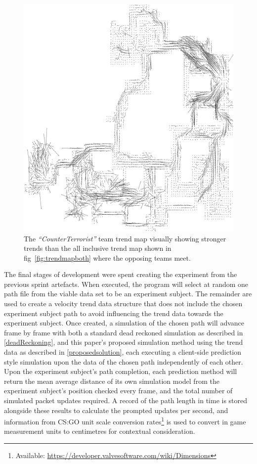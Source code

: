 \documentclass[journal]{IEEEtran}
\begin{document}
\begin{figure}[h]
    \centering
    \includegraphics[width=\linewidth]{TrendMapCT.png}
    \caption{The \textit{``CounterTerrorist''} team trend map visually showing stronger trends than the all inclusive trend map shown in fig~\ref{fig:trendmapboth} where the opposing teams meet.}
    \label{fig:trendmap_ct}
\end{figure}

The final stages of development were spent creating the experiment from the previous sprint artefacts. When executed, the program will select at random one path file from the viable data set to be an experiment subject. The remainder are used to create a velocity trend data structure that does not include the chosen experiment subject path to avoid influencing the trend data towards the experiment subject. Once created, a simulation of the chosen path will advance frame by frame with both a standard dead reckoned simulation as described in \ref{deadReckoning}, and this paper's proposed simulation method using the trend data as described in \ref{proposedsolution}, each executing a client-side prediction style simulation upon the data of the chosen path independently of each other. Upon the experiment subject's path completion, each prediction method will return the mean average distance of its own simulation model from the experiment subject's position checked every frame, and the total number of simulated packet updates required. A record of the path length in time is stored alongside these results to calculate the prompted updates per second, and information from CS:GO unit scale conversion rates\footnote[7]{Available: \url{https://developer.valvesoftware.com/wiki/Dimensions}} is used to convert in game measurement units to centimetres for contextual consideration.
\end{document}
